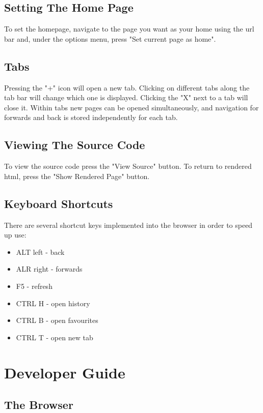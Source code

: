 \documentclass[11pt]{report}
\begin{document}
\section{Setting The Home Page}

To set the homepage, navigate to the page you want as your home using the url bar and, under the options menu, press "Set current page as home".

\section{Tabs}

Pressing the "+" icon will open a new tab.  Clicking on different tabs along the tab bar will change which one is displayed.  Clicking the "X" next to a tab will close it.  Within tabs new pages can be opened simultaneously, and navigation for forwards and back is stored independently for each tab.

\section{Viewing The Source Code}

To view the source code press the "View Source" button.  To return to rendered html, press the "Show Rendered Page" button.

\section{Keyboard Shortcuts}

There are several shortcut keys implemented into the browser in order to speed up use:
\begin{itemize}
\item ALT left - back
\item ALR right - forwards
\item F5 - refresh
\item CTRL H - open history
\item CTRL B - open favourites
\item CTRL T - open new tab
\end{itemize}

\chapter{Developer Guide}

\section{The Browser}
\end{document}
